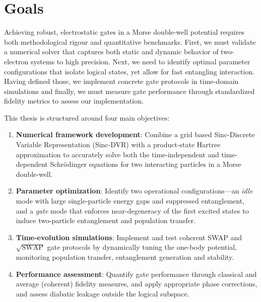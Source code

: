 \documentclass{subfiles}
\begin{document}
\section{Goals}
Achieving robust, electrostatic gates in a Morse double-well potential requires both methodological rigour and quantitative benchmarks. First, we must validate a numerical solver that captures both static and dynamic behavior of two-electron systems to high precision. Next, we need to identify optimal parameter configurations that isolate logical states, yet allow for fast entangling interaction. Having defined those, we implement concrete gate protocols in time-domain simulations and finally, we must measure gate performance through standardized fidelity metrics to assess our implementation.

This thesis is structured around four main objectives:
\begin{enumerate}
\item \textbf{Numerical framework development}: Combine a grid based Sinc-Discrete Variable Representation (Sinc-DVR) with a product-state Hartree approximation to accurately solve both the time-independent and time-dependent Schrödinger equations for two interacting particles in a Morse double-well.
\item \textbf{Parameter optimization}: Identify two operational configurations—an \textit{idle} mode with large single-particle energy gaps and suppressed entanglement, and a \textit{gate} mode that enforces near-degeneracy of the first excited states to induce two-particle entanglement and population transfer.
\item \textbf{Time-evolution simulations}: Implement and test coherent SWAP and $\sqrt{\text{SWAP}}$ gate protocols by dynamically tuning the one-body potential, monitoring population transfer, entanglement generation and stability.
\item \textbf{Performance assessment}: Quantify gate performance through classical and average (coherent) fidelity measures, and apply appropriate phase corrections, and assess diabatic leakage outside the logical subspace.
\end{enumerate}
\end{document}
